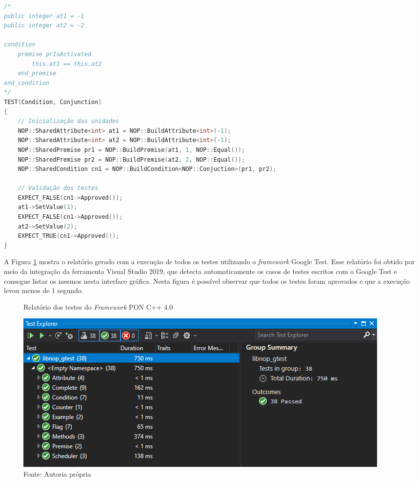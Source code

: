 \begin{lstlisting}[caption = {Caso de teste para \textit{Condition} do \textit{Framework} PON C++ 4.0},
source = {Autoria própria}, float=htb, language=C++,
label = {cod:test_cn},
]
/*
public integer at1 = -1
public integer at2 = -2

condition
    premise prIsActivated
        this.at1 == this.at2
    end_premise
end_condition
*/
TEST(Condition, Conjunction)
{
    // Inicialização das unidades
    NOP::SharedAttribute<int> at1 = NOP::BuildAttribute<int>(-1);
    NOP::SharedAttribute<int> at2 = NOP::BuildAttribute<int>(-1);
    NOP::SharedPremise pr1 = NOP::BuildPremise(at1, 1, NOP::Equal());
    NOP::SharedPremise pr2 = NOP::BuildPremise(at2, 2, NOP::Equal());
    NOP::SharedCondition cn1 = NOP::BuildCondition<NOP::Conjuction>(pr1, pr2);

    // Validação dos testes
    EXPECT_FALSE(cn1->Approved());
    at1->SetValue(1);
    EXPECT_FALSE(cn1->Approved());
    at2->SetValue(2);
    EXPECT_TRUE(cn1->Approved());
}
\end{lstlisting}

\FloatBarrier

A Figura \ref{fig:graph_tests} mostra o relatório gerado com a execução de todos
os testes utilizando o \textit{framework} Google Test. Esse relatório foi obtido
por meio da integração da ferramenta Visual Studio 2019, que detecta
automaticamente os casos de testes escritos com o Google Test e consegue listar
os mesmos nesta interface gráfica. Nesta figura é possível observar que todos os
testes foram aprovados e que a execução levou menos de 1 segundo. 

\begin{figure}[!htb]
\centering
\caption{Relatório dos testes do \textit{Framework} PON C++ 4.0}
\includegraphics[width=\textwidth]{../figures/gtest_020421.png}
\smallskip
\caption*{Fonte: Autoria própria}
\label{fig:graph_tests}
\end{figure}

